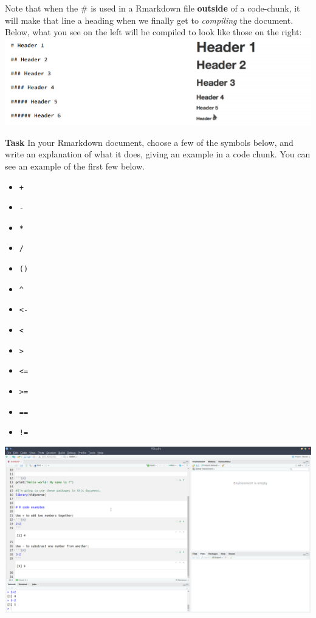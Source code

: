 \documentclass[]{book}
\providecommand{\tightlist}{%
  \setlength{\itemsep}{0pt}\setlength{\parskip}{0pt}}
\begin{document}
Note that when the \# is used in a Rmarkdown file \textbf{outside} of a code-chunk, it will make that line a heading when we finally get to \emph{compiling} the document. Below, what you see on the left will be compiled to look like those on the right:\\
\includegraphics{images/installing_intro/headings.png}

\textbf{Task}
In your Rmarkdown document, choose a few of the symbols below, and write an explanation of what it does, giving an example in a code chunk. You can see an example of the first few below.

\begin{itemize}
\tightlist
\item
  \texttt{+}
\item
  \texttt{-}
\item
  \texttt{*}
\item
  \texttt{/}
\item
  \texttt{()}
\item
  \texttt{\^{}}
\item
  \texttt{\textless{}-}
\item
  \texttt{\textless{}}
\item
  \texttt{\textgreater{}}
\item
  \texttt{\textless{}=}
\item
  \texttt{\textgreater{}=}
\item
  \texttt{==}
\item
  \texttt{!=}
\end{itemize}

\includegraphics{images/installing_intro/ss_examples.png}
\end{document}
